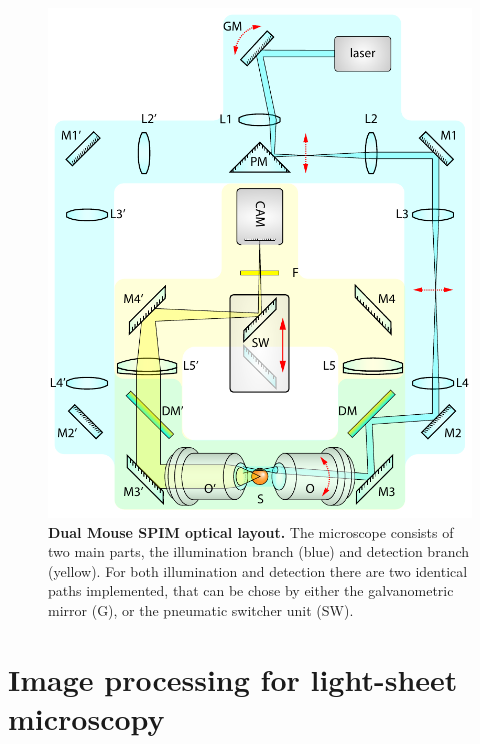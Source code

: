\documentclass{diploma_style}
\begin{document}
\begin{figure}[hbt]
	\centering
	\includegraphics[page=1,width=1\textwidth]{figures/2_DualMouse/fullSchematics}
	\caption{\textbf{Dual Mouse SPIM optical layout.} The microscope consists of two main parts, the illumination branch (blue) and detection branch (yellow). For both illumination and detection there are two identical paths implemented, that can be chose by either the galvanometric mirror (G), or the pneumatic switcher unit (SW). 
}
	\label{fig:fullSchematics}
\end{figure}

	
\chapter{Image processing for light-sheet microscopy}
\end{document}
